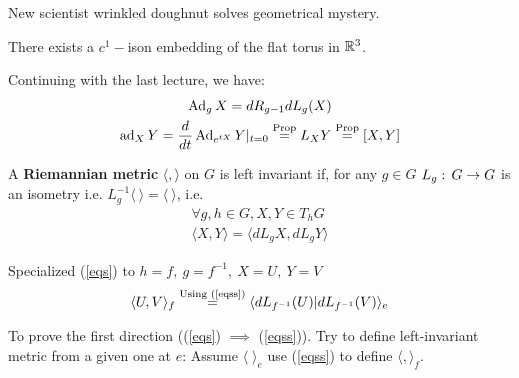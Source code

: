 New scientist wrinkled doughnut solves geometrical mystery.

\begin{teorema}[Gromov]
There exists a $c^1-$ison embedding of the flat torus in $\mathbb{R}^3$.
\end{teorema}

Continuing with the last lecture, we have:
\begin{gather*}
\operatorname{Ad}_g X = dR_{g-1}dL_g(X)\\
\operatorname{ad}_XY = \frac{d}{dt} \operatorname{Ad}_{e^{tX}}Y|_{t=0} \overset{\text{Prop}}{=} L_XY \overset{\text{Prop}}{=}[X,Y]
\end{gather*}

\begin{ddef}
A \textbf{Riemannian metric} $\langle,\rangle$ on $G$ is left invariant if, for any $g\in G$ $L_g:\, G\to G$ is an isometry i.e. $L^{-1}_g\langle\ \rangle = \langle\ \rangle$, i.e.
\begin{gather}
\forall g,h\in G,X,Y\in T_h G\label{eqs}\\
\langle X,Y\rangle = \langle dL_gX, dL_gY\rangle \label{eqss}
\end{gather}
\end{ddef}
Specialized (\ref{eqs}) to $h=f,\  g=f^{-1}, \ X=U,\ Y=V$
$$\langle U, V \rangle_f  \overset{\text{Using (\ref{eqss})}}{=} \langle dL_{f^{-1}}(U)|  dL_{f^{-1}}(V) \rangle_e$$

To prove the first direction ((\ref{eqs}) $\implies$ (\ref{eqss})). Try to define left-invariant metric from a given one at $e$: Assume $\langle \; \rangle_e$ use (\ref{eqss}) to define $\langle , \rangle_f$. 

